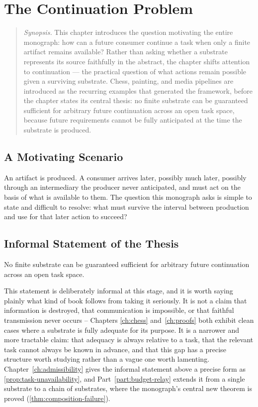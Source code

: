 \chapter{The Continuation Problem}
\label{ch:continuation-problem}

\begin{quotation}
\noindent\textit{Synopsis.} This chapter introduces the question motivating
the entire monograph: how can a future consumer continue a task when only a
finite artifact remains available? Rather than asking whether a substrate
represents its source faithfully in the abstract, the chapter shifts
attention to continuation --- the practical question of what actions remain
possible given a surviving substrate. Chess, painting, and media pipelines
are introduced as the recurring examples that generated the framework,
before the chapter states its central thesis: no finite substrate can be
guaranteed sufficient for arbitrary future continuation across an open task
space, because future requirements cannot be fully anticipated at the time
the substrate is produced.
\end{quotation}

\section{A Motivating Scenario}

An artifact is produced. A consumer arrives later, possibly much later,
possibly through an intermediary the producer never anticipated, and
must act on the basis of what is available to them. The question this
monograph asks is simple to state and difficult to resolve: what must
survive the interval between production and use for that later action to
succeed?

\section{Informal Statement of the Thesis}

\begin{principle}
\label{principle:global-insufficiency}
No finite substrate can be guaranteed sufficient for arbitrary future
continuation across an open task space.
\end{principle}

This statement is deliberately informal at this stage, and it is worth
saying plainly what kind of book follows from taking it seriously. It is
not a claim that information is destroyed, that communication is
impossible, or that faithful transmission never occurs -- Chapters
\ref{ch:chess} and~\ref{ch:proofs} both exhibit clean cases where a
substrate is fully adequate for its purpose. It is a narrower and more
tractable claim: that adequacy is always relative to a task, that the
relevant task cannot always be known in advance, and that this gap has a
precise structure worth studying rather than a vague one worth lamenting.
Chapter~\ref{ch:admissibility} gives the informal statement above a
precise form as \cref{prop:task-unavailability}, and
Part~\ref{part:budget-relay} extends it from a single substrate to a
chain of substrates, where the monograph's central new theorem is
proved (\cref{thm:composition-failure}).

